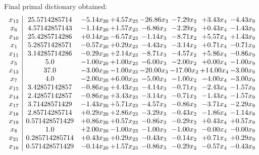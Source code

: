 \documentclass[8pt]{article}
\begin{document}
 Final primal dictionary obtained: 
\[\begin{array}{c| c c@{\hskip 2pt} c@{\hskip 2pt} c@{\hskip 2pt} c@{\hskip 2pt} c@{\hskip 2pt} c@{\hskip 2pt} }
 x_{12}   &  25.5714285714 & -5.14 x_{20} & +  4.57 x_{23} & -26.86 x_{3} & -7.29 x_{2} & +  3.43 x_{4} & -4.43 x_{9}\\
 x_{6}   &  4.57142857143 & -1.14 x_{20} & +  1.57 x_{23} & -6.86 x_{3} & -2.29 x_{2} & +  0.43 x_{4} & -1.43 x_{9}\\
 x_{10}   &  25.4285714286 & +  0.14 x_{20} & -6.57 x_{23} & -1.14 x_{3} & -8.71 x_{2} & +  5.57 x_{4} & +  1.43 x_{9}\\
 x_{1}   &  5.28571428571 & -0.57 x_{20} & +  0.29 x_{23} & -4.43 x_{3} & -3.14 x_{2} & +  0.71 x_{4} & -0.71 x_{9}\\
 x_{11}   &  3.14285714286 & -0.29 x_{20} & +  2.14 x_{23} & -8.71 x_{3} & -4.57 x_{2} & +  5.86 x_{4} & -0.86 x_{9}\\
 x_{5}   &  5.0 & -1.00 x_{20} & +  1.00 x_{23} & -6.00 x_{3} & -2.00 x_{2} & +  0.00 x_{4} & -1.00 x_{9}\\
 x_{13}   &  37.0 & -3.00 x_{20} & -1.00 x_{23} & -20.00 x_{3} & -17.00 x_{2} & + 14.00 x_{4} & -3.00 x_{9}\\
 x_{7}   &  4.0 & -2.00 x_{20} & +  6.00 x_{23} & -5.00 x_{3} & -1.00 x_{2} & -4.00 x_{4} & -3.00 x_{9}\\
 x_{15}   &  3.42857142857 & -0.86 x_{20} & +  4.43 x_{23} & -4.14 x_{3} & -0.71 x_{2} & -2.43 x_{4} & -1.57 x_{9}\\
 x_{14}   &  2.42857142857 & -0.86 x_{20} & +  3.43 x_{23} & -3.14 x_{3} & -0.71 x_{2} & -1.43 x_{4} & -1.57 x_{9}\\
 x_{17}   &  3.71428571429 & -1.43 x_{20} & +  5.71 x_{23} & -4.57 x_{3} & -0.86 x_{2} & -3.71 x_{4} & -2.29 x_{9}\\
 x_{18}   &  2.85714285714 & +  0.29 x_{20} & +  2.86 x_{23} & -3.29 x_{3} & -0.43 x_{2} & -1.86 x_{4} & -1.14 x_{9}\\
 x_{19}   &  0.571428571429 & +  0.86 x_{20} & +  0.57 x_{23} & -0.86 x_{3} & -0.29 x_{2} & +  0.43 x_{4} & +  0.57 x_{9}\\
 x_{8}   &  1.0 & +  2.00 x_{20} & -1.00 x_{23} & -1.00 x_{3} & -1.00 x_{2} & -0.00 x_{4} & -0.00 x_{9}\\
 x_{21}   &  0.285714285714 & +  0.43 x_{20} & +  0.29 x_{23} & -0.43 x_{3} & -0.14 x_{2} & +  0.71 x_{4} & +  0.29 x_{9}\\
 x_{16}   &  0.571428571429 & -0.14 x_{20} & +  1.57 x_{23} & -0.86 x_{3} & -0.29 x_{2} & -0.57 x_{4} & -0.43 x_{9}\\

\end{array}\]
\end{document}

